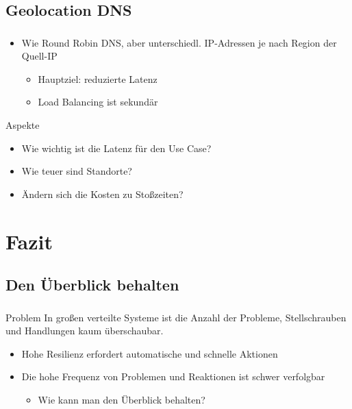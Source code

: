 \subsection{Geolocation DNS}
\begin{frame}
    \frametitle{\insertsection}
    \framesubtitle{\insertsubsection}

    \begin{itemize}
    	\item Wie Round Robin DNS, aber unterschiedl. IP-Adressen je nach Region der Quell-IP
		\begin{itemize}
			\item Hauptziel: reduzierte Latenz
			\item Load Balancing ist sekundär
		\end{itemize}
    \end{itemize}
    
    \begin{block}{Aspekte}
    	\begin{itemize}
    		\item Wie wichtig ist die Latenz für den Use Case?
    		\item Wie teuer sind Standorte?
    		\item Ändern sich die Kosten zu Stoßzeiten?
    	\end{itemize}
    \end{block}

\end{frame}

\section{Fazit}

\subsection{Den Überblick behalten}
\begin{frame}
	\frametitle{\insertsection}
    \framesubtitle{\insertsubsection}
    
    \begin{block}{Problem}
    In großen verteilte Systeme ist die Anzahl der Probleme, Stellschrauben und Handlungen kaum überschaubar.
    	\begin{itemize}
    		\item Hohe Resilienz erfordert automatische und schnelle Aktionen
    		\item Die hohe Frequenz von Problemen und Reaktionen ist schwer verfolgbar
    		\begin{itemize}
    			\item Wie kann man den Überblick behalten?
    		\end{itemize}
    	\end{itemize}
    \end{block}
\end{frame}

